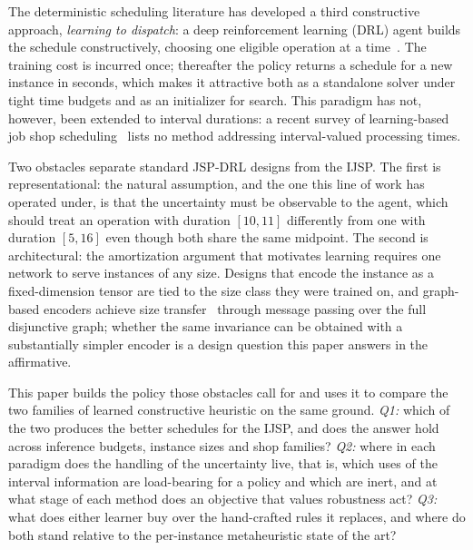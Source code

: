 \documentclass[preprint,12pt]{elsarticle}
\theoremstyle{definition}
\theoremstyle{remark}
\begin{document}
The deterministic scheduling literature has developed a third
constructive approach, \emph{learning to dispatch}: a deep
reinforcement learning (DRL) agent builds the schedule constructively,
choosing one eligible operation at a
time~\citep{Zhang2020L2D,Park2021GNN,Tassel2021}. The
training cost is incurred once; thereafter the policy returns a
schedule for a new instance in seconds, which makes it attractive both
as a standalone solver under tight time budgets and as an initializer
for search. This paradigm has not, however, been extended to interval
durations: a recent survey of
learning-based job shop scheduling~\citep{Xu2025} lists no method
addressing interval-valued processing times.

Two obstacles separate standard JSP-DRL designs from the IJSP.
The first is representational: the natural assumption, and the one
this line of work has operated under, is that the uncertainty must be
observable to the agent, which should treat an operation with
duration $[10,11]$ differently from one with duration $[5,16]$ even
though both share the same midpoint. The second is
architectural: the amortization argument that motivates learning
requires one network to serve instances of any size. Designs that
encode the instance as a fixed-dimension tensor are tied to the size
class they were trained on, and graph-based encoders achieve size
transfer~\citep{Zhang2020L2D,Park2021GNN} through message passing
over the full disjunctive graph; whether the same invariance can be
obtained with a substantially simpler encoder is a design question
this paper answers in the affirmative.

This paper builds the policy those obstacles call for and uses it to
compare the two families of learned constructive heuristic on the same
ground. \emph{Q1:} which of the two produces the better schedules for
the IJSP, and does the answer hold across inference budgets, instance
sizes and shop families? \emph{Q2:} where in each paradigm does the
handling of the uncertainty live, that is, which uses of the interval
information are load-bearing for a policy and which are inert, and at
what stage of each method does an objective that values robustness
act? \emph{Q3:} what does either learner buy over the hand-crafted
rules it replaces, and where do both stand relative to the
per-instance metaheuristic state of the art?
\end{document}
